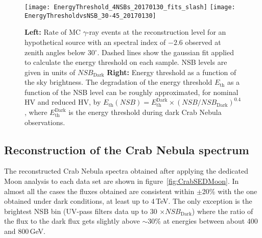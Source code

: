 \documentclass{PoS}
\begin{document}
\begin{figure}[t]
\centering
\texttt{[image: EnergyThreshold\_4NSBs\_20170130\_fits\_slash]}
\texttt{[image: EnergyThresholdvsNSB\_30-45\_20170130]}
\caption{\textbf{Left:} Rate of MC $\gamma$-ray events at the reconstruction  level for an hypothetical source with an spectral index of $-2.6$ observed at zenith angles below 30$^\circ$. %
Dashed lines show the gaussian fit applied to calculate the energy threshold on each sample. NSB levels are given in units of $\textit{NSB}_{\text{Dark}}$ \textbf{Right:} Energy threshold as a function of the sky brightness. %
The degradation of the energy threshold $E_{\text{th}}$ as a function of the NSB level can be roughly approximated, for nominal HV and reduced HV, by $E_{\text{th}}(\textit{NSB}) = E^{\text{Dark}}_{\text{th}} \times \left(\textit{NSB}/\textit{NSB}_{\text{Dark}}\right)^{0.4}$, where $E^{\text{Dark}}_{\text{th}}$ is the energy threshold during dark Crab Nebula observations.}\label{fig:EthNSB}
\end{figure}

\subsection*{Reconstruction of the Crab Nebula spectrum}

The reconstructed Crab Nebula spectra obtained after applying the dedicated Moon analysis to each data set are shown in figure~\ref{fig:CrabSEDMoon}. In almost all the cases the fluxes obtained are consistent within $\pm$20\% with the one obtained under dark conditions, at least up to 4\,TeV. The only exception is the brightest NSB bin (UV-pass filters data up to 30 $\times \textit{NSB}_{\text{Dark}}$) where the ratio of the flux to the dark flux gets slightly above $\sim$30\% at energies between about 400 and 800\,GeV.
\end{document}
